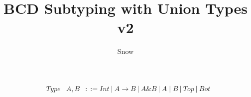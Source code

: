 \documentclass[a4paper]{article}
\title{BCD Subtyping with Union Types v2}
\author{Snow}
\begin{document}
\maketitle

\begin{align*}
&Type &A, B&::= Int ~|~ A\to B ~|~ A\& B ~|~ A\mid B ~|~ Top ~|~ Bot
\end{align*}

\bigskip


\ottdefnsOrdinaryType

\ottdefnsSplitType

\ottdefnsTopLikeType

\newpage

\ottdefnsOSubtyping

\ottdefnsSubtyping
\end{document}
